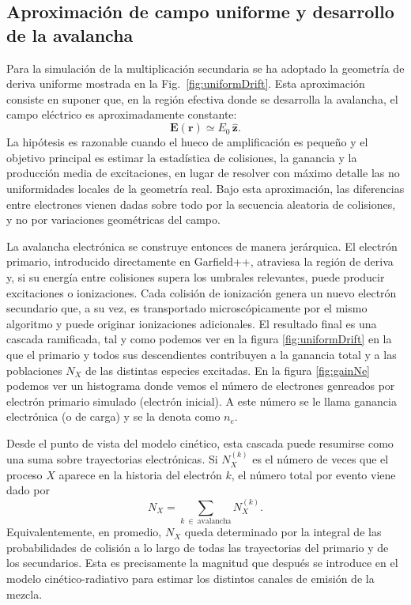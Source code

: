 \documentclass[12pt,a4paper]{article}
\begin{document}
\subsection{Aproximación de campo uniforme y desarrollo de la avalancha}

Para la simulación de la multiplicación secundaria se ha adoptado la geometría de deriva uniforme mostrada en la Fig.~\ref{fig:uniformDrift}. Esta aproximación consiste en suponer que, en la región efectiva donde se desarrolla la avalancha, el campo eléctrico es aproximadamente constante:
\begin{equation}
    \mathbf{E}(\mathbf{r}) \simeq E_0\, \hat{\mathbf{z}}.
\end{equation}
La hipótesis es razonable cuando el hueco de amplificación es pequeño y el objetivo principal es estimar la estadística de colisiones, la ganancia y la producción media de excitaciones, en lugar de resolver con máximo detalle las no uniformidades locales de la geometría real. Bajo esta aproximación, las diferencias entre electrones vienen dadas sobre todo por la secuencia aleatoria de colisiones, y no por variaciones geométricas del campo.

La avalancha electrónica se construye entonces de manera jerárquica. El electrón primario, introducido directamente en {Garfield++}, atraviesa la región de deriva y, si su energía entre colisiones supera los umbrales relevantes, puede producir excitaciones o ionizaciones. Cada colisión de ionización genera un nuevo electrón secundario que, a su vez, es transportado microscópicamente por el mismo algoritmo y puede originar ionizaciones adicionales. El resultado final es una cascada ramificada, tal y como podemos ver en la figura \ref{fig:uniformDrift} en la que el primario y todos sus descendientes contribuyen a la ganancia total y a las poblaciones \(N_X\) de las distintas especies excitadas. En la figura \ref{fig:gainNe} podemos ver un histograma donde vemos el número de electrones genreados por electrón primario simulado (electrón inicial). A este número se le llama ganancia electrónica (o de carga) y se la denota como $n_e$. 

Desde el punto de vista del modelo cinético, esta cascada puede resumirse como una suma sobre trayectorias electrónicas. Si \(N_X^{(k)}\) es el número de veces que el proceso \(X\) aparece en la historia del electrón \(k\), el número total por evento viene dado por
\begin{equation}
    N_X = \sum_{k \ \in \ \mathrm{avalancha}} N_X^{(k)}.
    \label{eq:NX_event}
\end{equation}
Equivalentemente, en promedio, \(N_X\) queda determinado por la integral de las probabilidades de colisión a lo largo de todas las trayectorias del primario y de los secundarios. Esta es precisamente la magnitud que después se introduce en el modelo cinético-radiativo para estimar los distintos canales de emisión de la mezcla.
\end{document}
